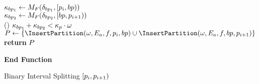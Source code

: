 \begin{algorithm}[t]
{{			
			{
				$\kappa_{bp_1}\leftarrow M_{F}(\delta_{bp_1},[p_{i}, bp))$   \\
				$\kappa_{bp_2}\leftarrow M_{F}(\delta_{bp_2},[bp, p_{i+1}))$ \\ %
				\If(){ $\kappa_{bp_1}+\kappa_{bp_2}  < \kappa_{p}  \cdot \omega$}{
					\vspace{0.2cm}
					$\SetPartitions \leftarrow \{\InsertPartition(\ReductionThreshold,\AbsError,f,\Partition{i},bp) \cup \InsertPartition(\ReductionThreshold,\AbsError,f,bp,\Partition{i+1}) \}$ \\
					\tcp*[f]{\footnotesize Recursive call for sub-intervals $[\Partition{i},bp)$ and $[bp,\Partition{i+1})$}
				}
			}
			\textbf{return} $ P $ \\	
			
		}	
		
	}
	\textbf{End Function}
	\caption{\small Binary Interval Splitting $[p_{i}, p_{i+1})$}\label{alg:alg1}
\end{algorithm}

